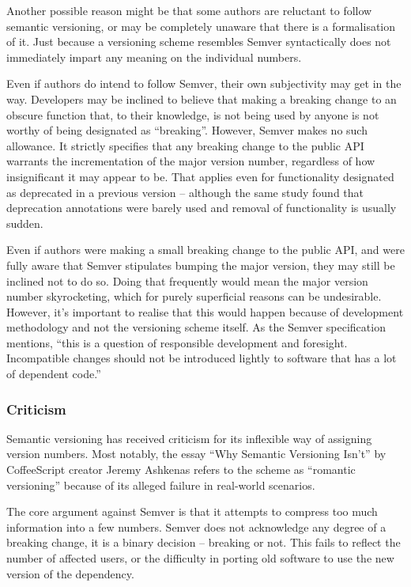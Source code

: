 \documentclass{l4proj}
\begin{document}
Another possible reason might be that some authors are reluctant to follow
semantic versioning, or may be completely unaware that there is a
formalisation of it. Just because a versioning scheme resembles Semver
syntactically does not immediately impart any meaning on the
individual numbers.

Even if authors do intend to follow Semver, their own subjectivity may
get in the way. Developers may be inclined to believe that making a
breaking change to an obscure function that, to their knowledge, is
not being used by anyone is not worthy of being designated as
``breaking''. However, Semver makes no such allowance. It strictly
specifies that any breaking change to the public API warrants
the incrementation of the major version number, regardless of how
insignificant it may appear to be. That applies even for functionality
designated as deprecated in a previous version -- although the same
study found that deprecation annotations were barely used and removal
of functionality is usually sudden.

Even if authors were making a small breaking change to the public API,
and were fully aware that Semver stipulates bumping the major version,
they may still be inclined not to do so. Doing that frequently would
mean the major version number skyrocketing, which for purely
superficial reasons can be undesirable. However, it's important to
realise that this would happen because of development methodology and
not the versioning scheme itself. As the Semver specification
mentions, ``this is a question of responsible development and
foresight. Incompatible changes should not be introduced lightly to
software that has a lot of dependent code.''

\subsubsection{Criticism}

Semantic versioning has received criticism for its inflexible way of
assigning version numbers. Most notably, the essay ``Why Semantic
Versioning Isn't'' \cite{WhySemanticVersioningIsnt} by CoffeeScript
creator Jeremy Ashkenas refers to the scheme as ``romantic
versioning'' because of its alleged failure in real-world scenarios.

The core argument against Semver is that it attempts to compress too
much information into a few numbers. Semver does not acknowledge any
degree of a breaking change, it is a binary decision -- breaking or not.
This fails to reflect the number of affected users, or the difficulty
in porting old software to use the new version of the dependency.
\end{document}

